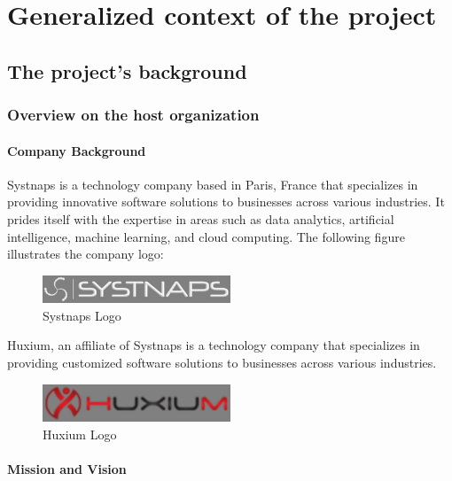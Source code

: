 \graphicspath{{./assets/}}
\setcounter{mtc}{1}
\chapter{Generalized context of the project }
\minitoc
\newpage
\section{The project's background}
\subsection{Overview on the host organization  }

\subsubsection{Company Background }
Systnaps is a technology company based in Paris, France that specializes in providing innovative software solutions to businesses across various industries. It prides itself with the expertise in areas such as data analytics, artificial intelligence, machine learning, and cloud computing. The following figure illustrates the company logo: 

\begin{figure}[!ht]\centering
\includegraphics[width=0.5\textwidth,angle=00]{assets/fa.png}
\caption{Systnaps Logo}
\end{figure}

Huxium, an affiliate of Systnaps is a technology company that specializes in providing customized software solutions to businesses across various industries. 


\begin{figure}[!ht]\centering
\includegraphics[width=0.5\textwidth,angle=00]{assets/fb.png}
\caption{Huxium Logo}
\end{figure}


 \subsubsection{Mission and Vision }

